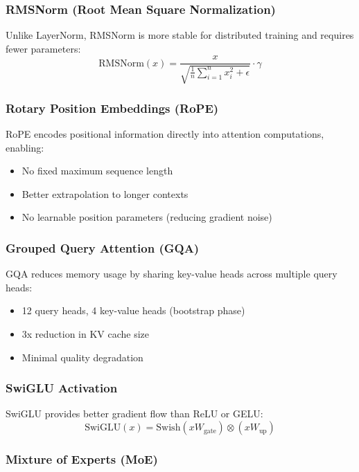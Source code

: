 \documentclass[11pt,a4paper]{article}
\begin{document}
\subsubsection{RMSNorm (Root Mean Square Normalization)}
Unlike LayerNorm, RMSNorm \cite{zhang2019root} is more stable for distributed training and requires fewer parameters:
\begin{equation}
\text{RMSNorm}(x) = \frac{x}{\sqrt{\frac{1}{n}\sum_{i=1}^{n}x_i^2 + \epsilon}} \cdot \gamma
\end{equation}

\subsubsection{Rotary Position Embeddings (RoPE)}
RoPE \cite{su2021roformer} encodes positional information directly into attention computations, enabling:
\begin{itemize}
    \item No fixed maximum sequence length
    \item Better extrapolation to longer contexts
    \item No learnable position parameters (reducing gradient noise)
\end{itemize}

\subsubsection{Grouped Query Attention (GQA)}
GQA \cite{ainslie2023gqa} reduces memory usage by sharing key-value heads across multiple query heads:
\begin{itemize}
    \item 12 query heads, 4 key-value heads (bootstrap phase)
    \item 3x reduction in KV cache size
    \item Minimal quality degradation
\end{itemize}

\subsubsection{SwiGLU Activation}
SwiGLU \cite{shazeer2020glu} provides better gradient flow than ReLU or GELU:
\begin{equation}
\text{SwiGLU}(x) = \text{Swish}(xW_{\text{gate}}) \otimes (xW_{\text{up}})
\end{equation}

\subsubsection{Mixture of Experts (MoE)}
\end{document}

